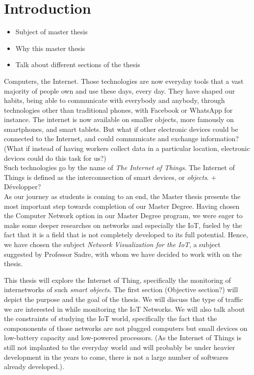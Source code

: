 \chapter*{Introduction}

\begin{itemize}
	\item Subject of master thesis
	\item Why this master thesis
	\item Talk about different sections of the thesis
\end{itemize}

Computers, the Internet. Those technologies are now everyday tools that a vast majority of people own and use these days, every day. They have shaped our habits, being able to communicate with everybody and anybody, through technologies other than traditional phones, with Facebook or WhatsApp for instance. The internet is now available on smaller objects, more famously on smartphones, and smart tablets. But what if other electronic devices could be connected to the Internet, and could communicate and exchange information? (What if instead of having workers collect data in a particular location, electronic devices could do this task for us?)\\

Such technologies go by the name of \textit{The Internet of Things}. The Internet of Things is defined as the interconnection of smart devices, or \textit{objects}. + Développer? \\

As our journey as students is coming to an end, the Master thesis presents the most important step towards completion of our Master Degree.  Having chosen the Computer Network option in our Master Degree program, we were eager to make some deeper researches on networks and especially the IoT, fueled by the fact that it is a field that is not completely developed to its full potential. Hence, we have chosen the subject \textit{Network Visualization for the IoT}, a subject suggested by Professor Sadre, with whom we have decided to work with on the thesis. \\


This thesis will explore the Internet of Thing, specifically the monitoring of internetworks of such \textit{smart objects}. The first section (Objective section?) will depict the purpose and the goal of the thesis. We will discuss the type of traffic we are interested in while monitoring the IoT Networks. We will also talk about the constraints of studying the IoT world, specifically the fact that the compononents of those networks are not plugged computers but small devices on low-battery capacity and low-powered processors. (As the Internet of Things is still not implanted to the everyday world and will probably be under heavier development in the years to come, there is not a large number of softwares already developed.).\\

